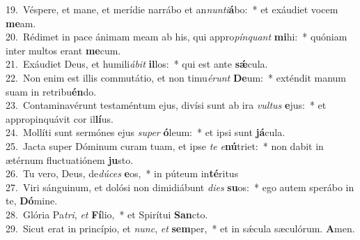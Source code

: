 {19.~}Véspere, et mane, et merídie narrábo et an\textit{nun}\textit{ti}\textbf{á}bo:~* et exáudiet vocem \textbf{me}am.\\
{20.~}Rédimet in pace ánimam meam ab his, qui appro\textit{pín}\textit{quant} \textbf{mi}hi:~* quóniam inter multos erant \textbf{me}cum.\\
{21.~}Exáudiet Deus, et humili\textit{á}\textit{bit} \textbf{il}los:~* qui est ante \textbf{sǽ}cula.\\
{22.~}Non enim est illis commutátio, et non timu\textit{é}\textit{runt} \textbf{De}um:~* exténdit manum suam in retribu\textbf{én}do.\\
{23.~}Contaminavérunt testaméntum ejus, divísi sunt ab ira \textit{vul}\textit{tus} \textbf{e}jus:~* et appropinquávit cor il\textbf{lí}us.\\
{24.~}Mollíti sunt sermónes ejus \textit{su}\textit{per} \textbf{ó}leum:~* et ipsi sunt \textbf{já}cula.\\
{25.~}Jacta super Dóminum curam tuam, et ipse \textit{te} \textit{e}\textbf{nú}triet:~* non dabit in ætérnum fluctuatiónem \textbf{ju}sto.\\
{26.~}Tu vero, Deus, de\textit{dú}\textit{ces} \textbf{e}os,~* in púteum in\textbf{té}ritus\\
{27.~}Viri sánguinum, et dolósi non dimidiábunt \textit{di}\textit{es} \textbf{su}os:~* ego autem sperábo in te, \textbf{Dó}mine.\\
{28.~}Glória Pa\textit{tri}, \textit{et} \textbf{Fí}lio,~* et Spirítui \textbf{San}cto.\\
{29.~}Sicut erat in princípio, et \textit{nunc}, \textit{et} \textbf{sem}per,~* et in sǽcula sæculórum. \textbf{A}men.\\
